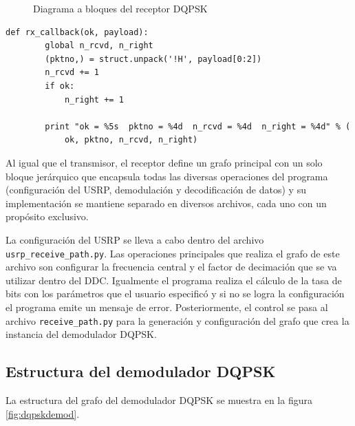\begin{figure}[htp]
  \centering
  \vspace{0.3in}
  \caption{Diagrama a bloques del receptor DQPSK}
  \label{fig:grdqpskrx}
\end{figure}

\begin{lstlisting}[float, label=ex:callback, caption={Funci\'on auxiliar que recibe los paquetes decodificados},
breaklines=true]
    def rx_callback(ok, payload):
        global n_rcvd, n_right
        (pktno,) = struct.unpack('!H', payload[0:2])
        n_rcvd += 1
        if ok:
            n_right += 1

        print "ok = %5s  pktno = %4d  n_rcvd = %4d  n_right = %4d" % (
            ok, pktno, n_rcvd, n_right)
\end{lstlisting}

Al igual que el transmisor, el receptor define un grafo principal con un solo bloque jer\'arquico que encapsula todas las
diversas operaciones del programa (configuraci\'on del USRP, demodulaci\'on y decodificaci\'on de datos) y su
implementaci\'on se mantiene separado en diversos archivos, cada uno con un prop\'osito exclusivo.

La configuraci\'on del USRP se lleva a cabo dentro del archivo \\ \verb|usrp_receive_path.py|. Las operaciones principales
que realiza el grafo de este archivo son configurar la frecuencia central y el factor de decimaci\'on que se va utilizar dentro
del DDC. Igualmente el programa realiza el c\'alculo de la tasa de bits con los par\'ametros que el usuario especific\'o y si
no se logra la configuraci\'on el programa emite un mensaje de error. Posteriormente, el control se pasa al archivo
\verb|receive_path.py| para la generaci\'on y configuraci\'on del grafo que crea la instancia del demodulador DQPSK.


\subsection{Estructura del demodulador DQPSK}
La estructura del grafo del demodulador DQPSK se muestra en la figura \ref{fig:dqpskdemod}.

